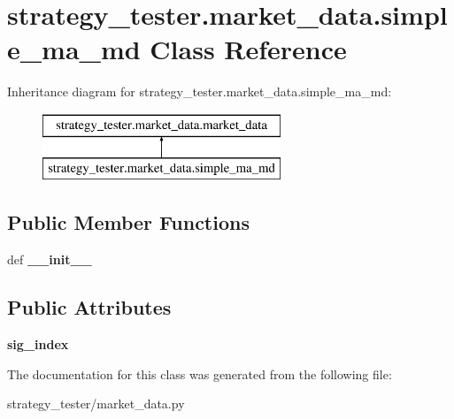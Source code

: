 \hypertarget{classstrategy__tester_1_1market__data_1_1simple__ma__md}{\section{strategy\-\_\-tester.\-market\-\_\-data.\-simple\-\_\-ma\-\_\-md \-Class \-Reference}
\label{classstrategy__tester_1_1market__data_1_1simple__ma__md}
}
\-Inheritance diagram for strategy\-\_\-tester.\-market\-\_\-data.\-simple\-\_\-ma\-\_\-md\-:\begin{figure}[H]
\begin{center}
\leavevmode
\includegraphics[height=2.000000cm]{classstrategy__tester_1_1market__data_1_1simple__ma__md}
\end{center}
\end{figure}
\subsection*{\-Public \-Member \-Functions}
\begin{DoxyCompactItemize}
\item 
\hypertarget{classstrategy__tester_1_1market__data_1_1simple__ma__md_a2c51d7cee7c3853331ced4de5953be26}{def {\bfseries \-\_\-\-\_\-init\-\_\-\-\_\-}}\label{classstrategy__tester_1_1market__data_1_1simple__ma__md_a2c51d7cee7c3853331ced4de5953be26}

\end{DoxyCompactItemize}
\subsection*{\-Public \-Attributes}
\begin{DoxyCompactItemize}
\item 
\hypertarget{classstrategy__tester_1_1market__data_1_1simple__ma__md_ae8bde69be78aa92bfce004a989ba956f}{{\bfseries sig\-\_\-index}}\label{classstrategy__tester_1_1market__data_1_1simple__ma__md_ae8bde69be78aa92bfce004a989ba956f}

\end{DoxyCompactItemize}


\-The documentation for this class was generated from the following file\-:\begin{DoxyCompactItemize}
\item 
strategy\-\_\-tester/market\-\_\-data.\-py\end{DoxyCompactItemize}
